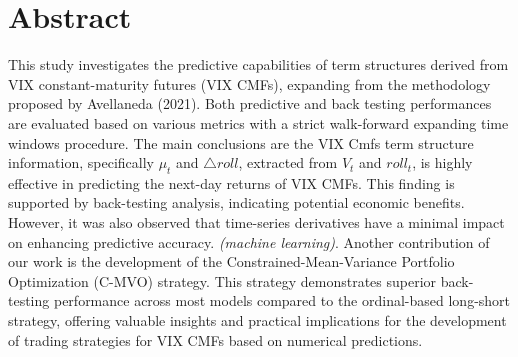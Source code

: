 \documentclass[10pt,letterpaper]{article}
\begin{document}
\section*{Abstract}
This study investigates the predictive capabilities of term structures derived from VIX constant-maturity futures (VIX CMFs), expanding from the methodology proposed by Avellaneda (2021). Both predictive and back testing performances are evaluated based on various metrics with a strict walk-forward expanding time windows procedure. The main conclusions are the VIX Cmfs term structure information, specifically \(\mu_t\) and \(\triangle roll\), extracted from \(V_t\) and \(roll_t\), is highly effective in predicting the next-day returns of VIX CMFs. This finding is supported by back-testing analysis, indicating potential economic benefits. However, it was also observed that time-series derivatives have a minimal impact on enhancing predictive accuracy. \textit{(machine learning)}. Another contribution of our work is the development of the Constrained-Mean-Variance Portfolio Optimization (C-MVO) strategy. This strategy demonstrates superior back-testing performance across most models compared to the ordinal-based long-short strategy, offering valuable insights and practical implications for the development of trading strategies for VIX CMFs based on numerical predictions.


\end{document}
